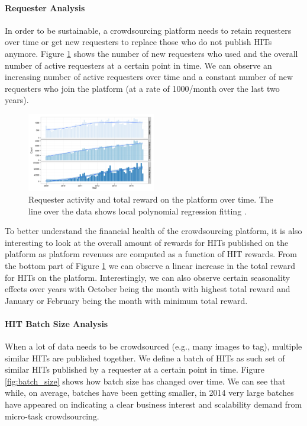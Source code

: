\paragraph{Requester Analysis}
In order to be sustainable, a crowdsourcing platform needs to retain requesters over time or get new requesters to replace those who do not publish HITs anymore. Figure \ref{fig:requesters_reward} shows the number of new requesters who used \amt{} and the overall number of active requesters at a certain point in time. We can observe an increasing number of active requesters over time and a constant number of new requesters who join the platform (at a rate of 1000/month over the last two years).

\begin{figure}[tb]
	\centering
		\includegraphics[width=0.5\textwidth]{figures/requesters_reward}
	\caption{Requester activity and total reward on the platform over time. The line over the data shows local polynomial regression fitting \cite{cleveland1992local}.}
	\label{fig:requesters_reward}
\end{figure}

To better understand the financial health of the crowdsourcing platform, it is also interesting to look at the overall amount of rewards for HITs  published on the platform as platform revenues are computed as a  function of  HIT rewards. From the bottom part of Figure \ref{fig:requesters_reward} we can  observe a linear increase in the total reward for HITs on the platform. Interestingly, we can also observe certain seasonality effects over years with October being the month with highest total reward and January or February being the month with minimum total reward.


\paragraph{HIT Batch Size Analysis}
When a lot of data needs to be crowdsourced (e.g., many images to tag), multiple similar HITs are published together. We define a batch of HITs as such set of similar HITs published by a requester at a certain point in time. Figure \ref{fig:batch_size} shows how  batch size has changed over time.
We can see that while, on average, batches have been getting smaller, in 2014 very large batches have appeared on \amt{} indicating a clear business interest and scalability demand from micro-task crowdsourcing.

